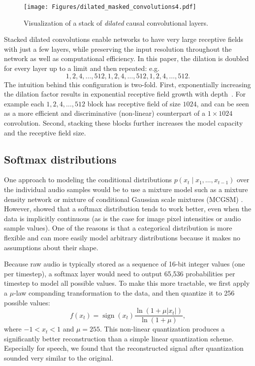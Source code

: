 \documentclass{article}
\makeatletter
\newcommand*{\eg}{e.g.\@\xspace}
\makeatother
\begin{document}
\begin{figure}[ht]
\centering
\texttt{[image: Figures/dilated\_masked\_convolutions4.pdf]}
\caption{Visualization of a stack of \emph{dilated} causal convolutional layers.}
\label{fig:masked_dilated_convolution}
\end{figure}

Stacked dilated convolutions enable networks to have very large receptive fields with just a few layers, while preserving the input resolution throughout the network as well as computational efficiency. In this paper, the dilation is doubled for every layer up to a limit and then repeated: \eg $$1,2,4,\dots,512,1,2,4,\dots,512,1,2,4,\dots,512.$$
The intuition behind this configuration is two-fold. First, exponentially increasing the dilation factor results in exponential receptive field growth with depth~\citep{YuKoltun2016}.  For example each $1,2,4,\dots,512$ block has receptive field of size $1024$, and can be seen as a more efficient and discriminative (non-linear) counterpart of a $1\times1024$ convolution. Second, stacking these blocks further increases the model capacity and the receptive field size.

\subsection{Softmax distributions}

One approach to modeling the conditional distributions $p\left(x_t \mid x_1, \dots ,x_{t-1}\right)$ over the individual audio samples would be to use a mixture model such as a mixture density network \citep{MDN} or mixture of conditional Gaussian scale mixtures (MCGSM) \citep{theis2015generative}.
However, \cite{van2016pixel} showed that a softmax distribution tends to work better, even when the data is implicitly continuous (as is the case for image pixel intensities or audio sample values). One of the reasons is that a categorical distribution is more flexible and can more easily model arbitrary distributions because it makes no assumptions about their shape.

Because raw audio is typically stored as a sequence of 16-bit integer values (one per timestep), a softmax layer would need to output 65,536 probabilities per timestep to model all possible values. To make this more tractable, we first apply a $\mu$-law companding transformation \citep{G711} to the data, and then quantize it to 256 possible values:
$$
f\left(x_t\right) = \operatorname{sign}(x_t) \frac{\ln \left(1+\mu \left| x_t \right|\right)}{\ln \left(1+\mu\right)},
$$
where $-1 < x_t < 1$ and $\mu = 255$. 
This non-linear quantization produces a significantly better reconstruction than a simple linear quantization scheme. Especially for speech, we found that the reconstructed signal after quantization sounded very similar to the original.
\end{document}
